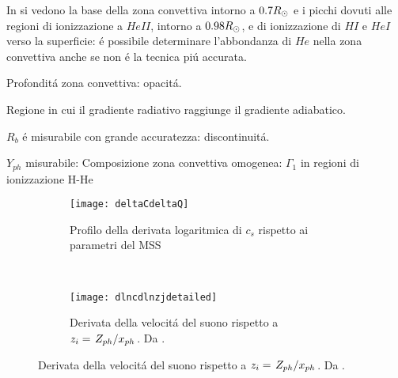\documentclass[../main.tex]{subfiles}
\begin{document}
In  si vedono la base della zona convettiva intorno a $0.7R_{\odot}{}$ e i picchi dovuti alle regioni di ionizzazione a $HeII$, intorno a $0.98R_{\odot}{}$, e di ionizzazione di $HI$ e $HeI$ verso la superficie: \'e possibile determinare l'abbondanza di $He$ nella zona convettiva anche se non \'e la tecnica pi\'u accurata.

\begin{workout}

Profondit\'a zona convettiva: opacit\'a. 

Regione in cui il gradiente radiativo raggiunge il gradiente adiabatico.


$R_b$ \'e misurabile con grande accuratezza: discontinuit\'a.

$Y_{ph}$ misurabile: Composizione zona convettiva omogenea:  $\Gamma_1$ in regioni di ionizzazione H-He

\begin{figure}[!h]
\begin{subfigure}[r]{0.6\textwidth}
        \texttt{[image: deltaCdeltaQ]}
        \caption{Profilo della derivata logaritmica di $c_s$ rispetto ai parametri del MSS}
    \end{subfigure}
~
\begin{subfigure}[r]{0.4\textwidth}
        \texttt{[image: dlncdlnzjdetailed]}
        \caption{Derivata della velocit\'a del suono rispetto a $z_i=\left.{Z_{ph}}\middle/{x_{ph}}\right.$. Da \cite{villante2014chemical}.}
    \end{subfigure}
\end{figure}

\end{workout}
\end{document}

